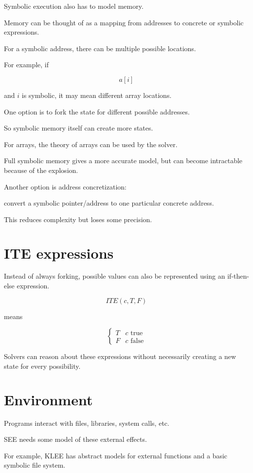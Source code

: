 \documentclass[11pt]{book}
\begin{document}
Symbolic execution also has to model memory.

Memory can be thought of as a mapping from addresses to
concrete or symbolic expressions.

For a symbolic address, there can be multiple possible
locations.

For example, if

\[
a[i]
\]

and $i$ is symbolic, it may mean different array locations.

One option is to fork the state for different possible
addresses.

So symbolic memory itself can create more states.

For arrays, the theory of arrays can be used by the solver.

Full symbolic memory gives a more accurate model,
but can become intractable because of the explosion.

Another option is address concretization:

convert a symbolic pointer/address to one particular
concrete address.

This reduces complexity but loses some precision.

\section{ITE expressions}

Instead of always forking, possible values can also
be represented using an if-then-else expression.

\[
ITE(c,T,F)
\]

means

\[
\begin{cases}
T & c\text{ true}\\
F & c\text{ false}
\end{cases}
\]

Solvers can reason about these expressions without
necessarily creating a new state for every possibility.

\section{Environment}

Programs interact with files, libraries, system calls, etc.

SEE needs some model of these external effects.

For example, KLEE has abstract models for external
functions and a basic symbolic file system.
\end{document}

